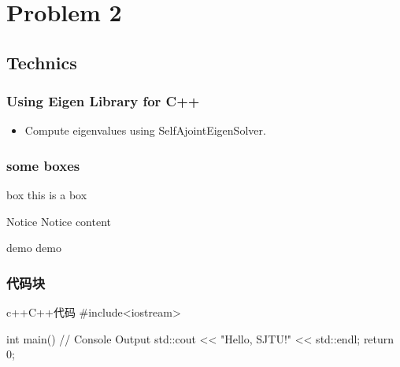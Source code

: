 \section{Problem 2}
\subsection{Technics}

    \begin{frame}
        \frametitle{Using Eigen Library for C++}

        \begin{itemize}
            \item Compute eigenvalues using SelfAjointEigenSolver.
        \end{itemize}

    \end{frame}

    \begin{frame}
    \frametitle{some boxes}
    
    \begin{block}{box}
        this is a box\cite{beamerman}
    \end{block}

    \begin{alertblock}{Notice}
        Notice content
    \end{alertblock}

    \begin{exampleblock}{demo}
        demo
    \end{exampleblock}
\end{frame}

\begin{frame}[fragile]          %
    \frametitle{代码块}
    \begin{codeblock}{c++}{C++代码}
#include<iostream>

int main(){
// Console Output
std::cout << "Hello, SJTU!" << std::endl;
return 0;
}
    \end{codeblock}
\end{frame}

